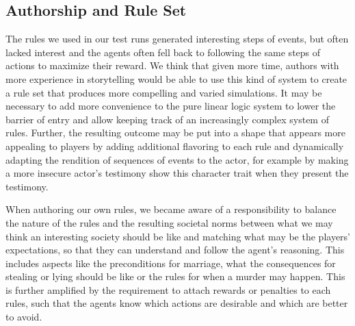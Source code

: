 \subsection{Authorship and Rule Set}
The rules we used in our test runs generated interesting steps of events, but often lacked interest and the agents often fell back to following the same steps of actions to maximize their reward.
We think that given more time, authors with more experience in storytelling would be able to use this kind of system to create a rule set that produces more compelling and varied simulations.
It may be necessary to add more convenience to the pure linear logic system to lower the barrier of entry and allow keeping track of an increasingly complex system of rules.
Further, the resulting outcome may be put into a shape that appears more appealing to players by adding additional flavoring to each rule and dynamically adapting the rendition of sequences of events to the actor, for example by making a more insecure actor's testimony show this character trait when they present the testimony.

When authoring our own rules, we became aware of a responsibility to balance the nature of the rules and the resulting societal norms between what we may think an interesting society should be like and matching what may be the players' expectations, so that they can understand and follow the agent's reasoning.
This includes aspects like the preconditions for marriage, what the consequences for stealing or lying should be like or the rules for when a murder may happen.
This is further amplified by the requirement to attach rewards or penalties to each rules, such that the agents know which actions are desirable and which are better to avoid.

